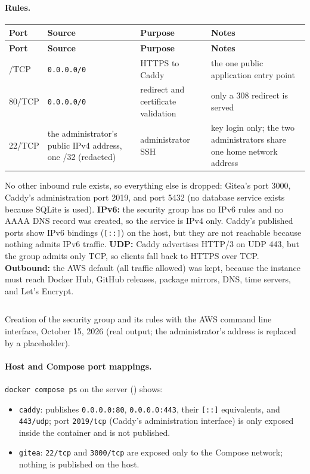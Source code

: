\paragraph{Rules.}
\begin{tabularx}{\linewidth}{L{1.9cm}L{3.0cm}L{2.3cm}Y}
\caption{Inbound rules, IPv4 (IPv6 has no rules)\label{Table:InboundRules}}\\
\toprule \textbf{Port} & \textbf{Source} & \textbf{Purpose} & \textbf{Notes}\\ \midrule
\endfirsthead
\toprule \textbf{Port} & \textbf{Source} & \textbf{Purpose} & \textbf{Notes}\\ \midrule
\endhead \bottomrule {}/TCP & \texttt{0.0.0.0/0} & HTTPS to Caddy & the one public application entry point\\
80/TCP & \texttt{0.0.0.0/0} & redirect and certificate validation & only a 308 redirect is served\\
22/TCP & the administrator's public IPv4 address, one /32 (redacted) & administrator SSH & key login only; the two administrators share one home network address\\
\end{tabularx}
No other inbound rule exists, so everything else is dropped: Gitea's port
3000, Caddy's administration port 2019, and port 5432 (no database service
exists because SQLite is used). \textbf{IPv6:} the security group has no IPv6
rules and no AAAA DNS record was created, so the service is IPv4 only. Caddy's
published ports show IPv6 bindings (\texttt{[::]}) on the host, but they are not
reachable because nothing admits IPv6 traffic. \textbf{UDP:} Caddy advertises
HTTP/3 on UDP 443, but the group admits only TCP, so clients fall back to
HTTPS over TCP. \textbf{Outbound:} the AWS default (all traffic allowed) was
kept, because the instance must reach Docker Hub, GitHub releases, package
mirrors, DNS, time servers, and Let's Encrypt.

\begin{longlisting}
\inputminted[fontsize=\scriptsize]{text}{../evidence/08-aws-security-group-created-ssw590-g1-gitea-2026-10-15.txt}
\caption{Creation of the security group and its rules with the AWS command line interface, October 15, 2026 (real output; the administrator's address is replaced by a placeholder).}
\label{Listing:E08}
\end{longlisting}

\paragraph{Host and Compose port mappings.}
\texttt{docker compose ps} on the server () shows:
\begin{itemize}[nosep]
  \item \texttt{caddy}: publishes \texttt{0.0.0.0:80}, \texttt{0.0.0.0:443}, their \texttt{[::]} equivalents, and \texttt{443/udp}; port \texttt{2019/tcp} (Caddy's administration interface) is only exposed inside the container and is not published.
  \item \texttt{gitea}: \texttt{22/tcp} and \texttt{3000/tcp} are exposed only to the Compose network; nothing is published on the host.
\end{itemize}


